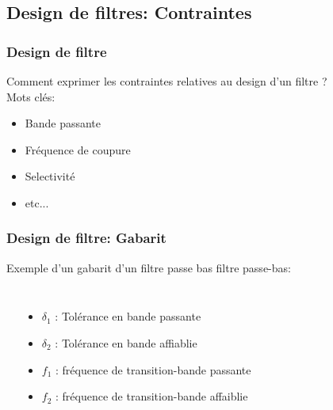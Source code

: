 \documentclass{beamer}
\begin{document}
\subsection{Design de filtres: Contraintes}
\begin{frame}
\frametitle{Design de filtre}
Comment exprimer les contraintes relatives au design d'un filtre ?\\
\vspace{1cm}
Mots clés:
\begin{itemize}
\item<2->  Bande passante 
\vspace{0.3cm}
\item<3-> Fréquence de coupure
\vspace{0.3cm} 
\item<4->  Selectivité
\vspace{0.3cm}
\item<5-> etc...
\end{itemize}
\vspace{1cm}

\end{frame}

\begin{frame}
\frametitle{Design de filtre: Gabarit}
Exemple d'un gabarit d'un filtre passe bas filtre passe-bas:\\
\vspace{0.5cm} 
\begin{columns}
\column{60mm}
\begin{center}
\end{center}

\column{60mm}
\begin{itemize}
\item<2-> $\delta_1$ : Tolérance en bande passante 
\vspace{0.2cm}
\item<3->$\delta_2$ : Tolérance en bande affiablie  
\vspace{0.2cm}
\item<4-> $f_1$ : fréquence de transition-bande passante 
\vspace{0.2cm}
\item<5-> $f_2$ : fréquence de transition-bande affaiblie 
\end{itemize}

\end{columns}
\end{frame}
\end{document}

